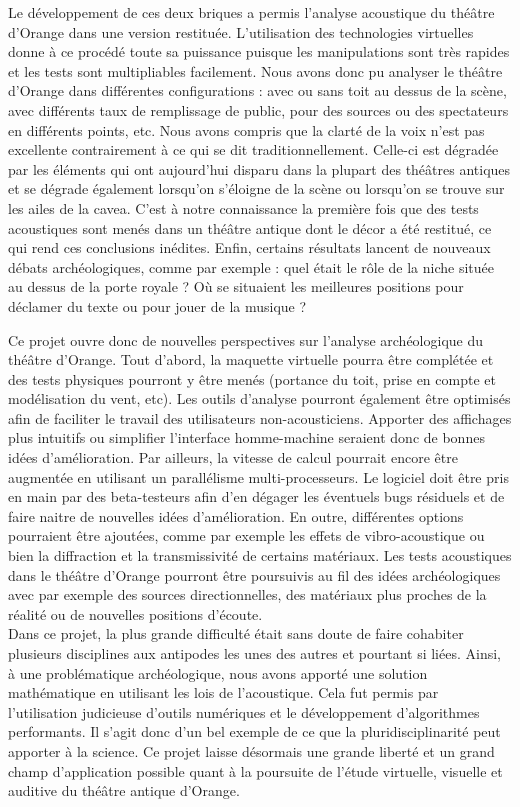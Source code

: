 Le développement de ces deux briques a permis l'analyse acoustique du théâtre d'Or\-ange dans une version restituée. L'utilisation des technologies virtuelles donne à ce procédé toute sa puissance puisque les manipulations sont très rapides et les tests sont multipliables facilement. Nous avons donc pu analyser le théâtre d'Orange dans différentes configurations : avec ou sans toit au dessus de la scène, avec différents taux de remplissage de public, pour des sources ou des spectateurs en différents points, etc. Nous avons compris que la clarté de la voix n'est pas excellente contrairement à ce qui se dit traditionnellement. Celle-ci est dégradée par les éléments qui ont aujourd'hui disparu dans la plupart des théâtres antiques et se dégrade également lorsqu'on s'éloigne de la scène ou lorsqu'on se trouve sur les ailes de la \gls{cavea}. C'est à notre connaissance la première fois que des tests acoustiques sont menés dans un théâtre antique dont le décor a été restitué, ce qui rend ces conclusions inédites. Enfin, certains résultats lancent de nouveaux débats archéologiques, comme par exemple : quel était le rôle de la niche située au dessus de la porte royale ? Où se situaient les meilleures positions pour déclamer du texte ou pour jouer de la musique ?

Ce projet ouvre donc de nouvelles perspectives sur l'analyse archéologique du théâtre d'Orange. Tout d'abord, la maquette virtuelle pourra être complétée et des tests physiques pourront y être menés (portance du toit, prise en compte et modélisation du vent, etc). Les outils d'analyse pourront également être optimisés afin de faciliter le travail des utilisateurs non-acousticiens. Apporter des affichages plus intuitifs \cite[]{immersive} ou simplifier l'interface homme-machine seraient donc de bonnes idées d'amélioration. Par ailleurs, la vitesse de calcul pourrait encore être augmentée en utilisant un parallélisme multi-processeurs. Le logiciel doit être pris en main par des beta-testeurs afin d'en dégager les éventuels bugs résiduels et de faire naitre de nouvelles idées d'amélioration. En outre, différentes options pourraient être ajoutées, comme par exemple les effets de vibro-acoustique ou bien la diffraction et la transmissivité de certains matériaux. Les tests acoustiques dans le théâtre d'Orange pourront être poursuivis au fil des idées archéologiques avec par exemple des sources directionnelles, des matériaux plus proches de la réalité ou de nouvelles positions d'écoute. \\

Dans ce projet, la plus grande difficulté était sans doute de faire cohabiter plusieurs disciplines aux antipodes les unes des autres et pourtant si liées. Ainsi, à une problématique archéologique, nous avons apporté une solution mathématique en utilisant les lois de l'acoustique. Cela fut permis par l'utilisation judicieuse d'outils numériques et le développement d'algorithmes performants. Il s'agit donc d'un bel exemple de ce que la pluridisciplinarité peut apporter à la science. Ce projet laisse désormais une grande liberté et un grand champ d'application possible quant à la poursuite de l'étude virtuelle, visuelle et auditive du théâtre antique d'Orange.



 
 
